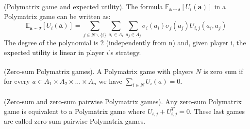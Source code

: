 (Polymatrix game and expected utility). The formula $ \mathbb{E}_{\mathbf{a} \sim \mathbf{s}} [U_{i}(\mathbf{a})] $ in a Polymatrix game can be written as:
$$
\mathbb{E}_{\mathbf{a} \sim \sigma} [U_{i}(\mathbf{a}) ] = \sum_{j \in N \backslash\{i\}} \sum_{a_{i} \in A_{i}} \sum_{a_{j} \in A_{j}} \sigma_{i} (a_{i}) \sigma_{j} (a_{j}) U_{i, j} (a_{i}, a_{j})
$$
The degree of the polynomial is 2 (independently from n) and, given player i, the expected utility is linear
in player $ i $’s strategy.\\\\
(Zero-sum Polymatrix games). A Polymatrix game with players $ N $ is zero sum if for every $ a \in A_1 \times A_2 \times \ldots \times A_n $ we have $ \sum_{i \in N} U_{i}(a) = 0 $.\\\\
(Zero-sum and zero-sum pairwise Polymatrix games). Any zero-sum Polymatrix game is equivalent to a Polymatrix game where $ U_{i,j} + U_{i,j}^T = 0 $. These last games are called zero-sum pairwise Polymatrix
games.


